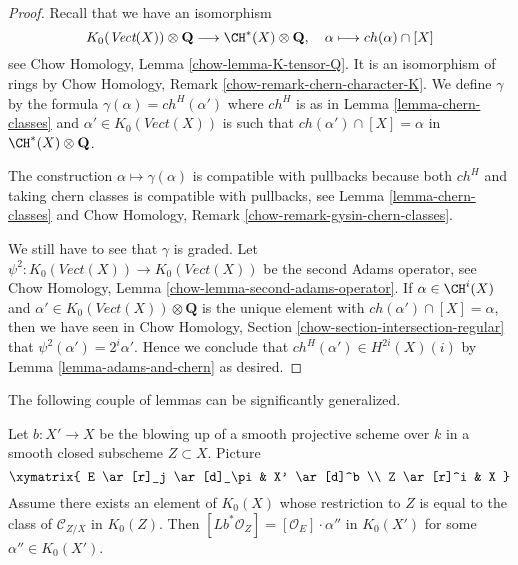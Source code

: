 \begin{proof}
Recall that we have an isomorphism
$$
K_0(\textit{Vect}(X)) \otimes \mathbf{Q}
\longrightarrow \CH^*(X) \otimes \mathbf{Q},\quad
\alpha \longmapsto ch(\alpha) \cap [X]
$$
see Chow Homology, Lemma \ref{chow-lemma-K-tensor-Q}. It is an isomorphism
of rings by Chow Homology, Remark \ref{chow-remark-chern-character-K}.
We define $\gamma$ by the formula $\gamma(\alpha) = ch^H(\alpha')$
where $ch^H$ is as in Lemma \ref{lemma-chern-classes} and
$\alpha' \in K_0(\textit{Vect}(X))$ is such that
$ch(\alpha') \cap [X] = \alpha$ in $\CH^*(X) \otimes \mathbf{Q}$.

\medskip\noindent
The construction $\alpha \mapsto \gamma(\alpha)$ is compatible
with pullbacks because both $ch^H$ and taking chern classes
is compatible with pullbacks, see
Lemma \ref{lemma-chern-classes} and
Chow Homology, Remark \ref{chow-remark-gysin-chern-classes}.

\medskip\noindent
We still have to see that $\gamma$ is graded.
Let $\psi^2 : K_0(\textit{Vect}(X)) \to K_0(\textit{Vect}(X))$
be the second Adams operator, see Chow Homology,
Lemma \ref{chow-lemma-second-adams-operator}.
If $\alpha \in \CH^i(X)$ and
$\alpha' \in K_0(\textit{Vect}(X)) \otimes \mathbf{Q}$
is the unique element with $ch(\alpha') \cap [X] = \alpha$,
then we have seen in
Chow Homology, Section \ref{chow-section-intersection-regular}
that $\psi^2(\alpha') = 2^i \alpha'$.
Hence we conclude that $ch^H(\alpha') \in H^{2i}(X)(i)$
by Lemma \ref{lemma-adams-and-chern} as desired.
\end{proof}

\noindent
The following couple of lemmas can be significantly generalized.

\begin{lemma}
\label{lemma-good-blowing-up}
Let $b : X' \to X$ be the blowing up of a smooth projective
scheme over $k$ in a smooth closed subscheme $Z \subset X$.
Picture
$$
\xymatrix{
E \ar[r]_j \ar[d]_\pi & X' \ar[d]^b \\
Z \ar[r]^i & X
}
$$
Assume there exists an element of $K_0(X)$ whose restriction to
$Z$ is equal to the class of $\mathcal{C}_{Z/X}$ in $K_0(Z)$.
Then $[Lb^*\mathcal{O}_Z] = [\mathcal{O}_E] \cdot \alpha''$
in $K_0(X')$ for some $\alpha'' \in K_0(X')$.
\end{lemma}

